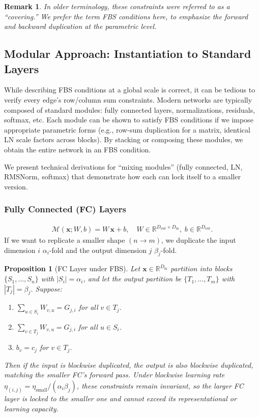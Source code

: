 \documentclass[11pt]{article}
\newtheorem{proposition}{Proposition}[section]
\newtheorem{remark}{Remark}[section]
\begin{document}
\begin{remark}
In older terminology, these constraints were referred to as a ``covering.'' We prefer the term FBS conditions here, to emphasize the forward and backward duplication at the parametric level.
\end{remark}

\subsection{Modular Approach: Instantiation to Standard Layers}
While describing FBS conditions at a global scale is correct, it can be tedious to verify every edge's row/column sum constraints. Modern networks are typically composed of standard modules: fully connected layers, normalizations, residuals, softmax, etc. Each module can be shown to satisfy FBS conditions if we impose appropriate parametric forms (e.g., row-sum duplication for a matrix, identical LN scale factors across blocks). By stacking or composing these modules, we obtain the entire network in an FBS condition.

We present technical derivations for ``mixing modules'' (fully connected, LN, RMSNorm, softmax) that demonstrate how each can lock itself to a smaller version.

\subsubsection{Fully Connected (FC) Layers}
\begin{align*}
  \mathcal{M}(\mathbf{x};W,b)
  =
  W\,\mathbf{x} + b, 
  \quad
  W\in\mathbb{R}^{D_{\text{out}}\times D_{\text{in}}},\;
  b\in \mathbb{R}^{D_{\text{out}}}.
\end{align*}
If we want to replicate a smaller shape $(n \to m)$, we duplicate the input dimension $i$ $\alpha_i$-fold and the output dimension $j$ $\beta_j$-fold.

\begin{proposition}[FC Layer under FBS]
\label{prop:FC_FBS}
Let $\mathbf{x}\in \mathbb{R}^{D_{\text{in}}}$ partition into blocks $\{S_1,\dots,S_n\}$ with $|S_i|=\alpha_i$, and let the output partition be $\{T_1,\dots,T_m\}$ with $|T_j|=\beta_j$. Suppose:
\begin{enumerate}
    \item $\sum_{u\in S_i}W_{v,u} = G_{j,i}$ for all $v\in T_j$.
    \item $\sum_{v\in T_j}W_{v,u} = G_{j,i}$ for all $u\in S_i$.
    \item $b_v = c_j$ for $v\in T_j$.
\end{enumerate}
Then if the input is blockwise duplicated, the output is also blockwise duplicated, matching the smaller FC's forward pass. Under blockwise learning rate $\eta_{(i,j)}=\eta_{\text{small}}/(\alpha_i\beta_j)$, these constraints remain invariant, so the larger FC layer is locked to the smaller one and cannot exceed its representational or learning capacity.
\end{proposition}
\end{document}

